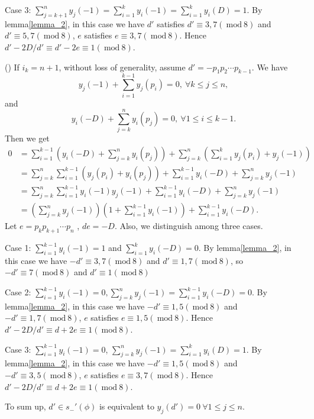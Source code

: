 \documentclass{amsart}
\numberwithin{equation}{section}
\theoremstyle{plain}
\theoremstyle{definition}
\renewcommand{\mod}[1]{\ \mathrm{mod}\ #1}  %
\begin{document}
{	Case 3: $\sum\limits_{j = k+1}^{n} y_{j}(-1) = \sum\limits_{i = 1}^{k}y_{i}(-1) = \sum\limits_{i = 1}^{k} y_{i}(D) = 1$.  By lemma\ref{lemma_2}, in this case we have $d'$ satisfies  $d' \equiv 3,7 (\mod 8)$ and $d' \equiv 5,7 (\mod 8)$, $e$ satisfies  $e \equiv 3,7 (\mod 8)$. Hence $d' - 2D/d' \equiv d' - 2e \equiv 1 (\mod 8)$.

	() If $i_k = n+1$, without loss of generality, assume $d' = -p_{1}p_{2}\cdots p_{k-1}$. We have
	$$ y_{j}(-1) + \sum\limits_{i = 1}^{k-1} y_{j}(p_i) = 0, \ \forall  k \le j \le n,$$
	and
	$$  y_{i}(-D) +\sum\limits_{j = k}^{n} y_{i}(p_j) = 0 , \   \forall 1 \le i \le k-1. $$
Then we get
	$$
	\begin{aligned}
	0 &= \sum\limits_{i = 1}^{k-1} (y_{i}(-D) +\sum\limits_{j = k}^{n} y_{i}(p_j) ) + \sum\limits_{j = k}^{n}(\sum\limits_{i = 1}^{k} y_{j}(p_i) + y_{j}(-1))  \\
	 &= \sum\limits_{j = k}^{n}\sum\limits_{i = 1}^{k-1}(y_{j}(p_i) + y_{i}(p_j)) + \sum\limits_{i = 1}^{k-1} y_{i}(-D) + \sum\limits_{j = k}^{n} y_{j}(-1)\\
	 &= \sum\limits_{j = k}^{n}\sum\limits_{i = 1}^{k-1} y_{i}(-1)y_{j}(-1) + \sum\limits_{i = 1}^{k-1} y_{i}(-D)+ \sum\limits_{j = k}^{n} y_{j}(-1)\\
	&= (\sum\limits_{j = k}^{n} y_{j}(-1))(1+\sum\limits_{i = 1}^{k-1}y_{i}(-1)) + \sum\limits_{i = 1}^{k-1} y_{i}(-D).
	\end{aligned}
	$$
	Let $e = p_{k}p_{k+1}\cdots p_{n}$ , $de = -D$. Also, we distinguish among three cases.

	Case 1: $\sum\limits_{i = 1}^{k-1}y_{i}(-1) = 1$ and  $\sum\limits_{i = 1}^{k} y_{i}(-D) = 0 $. By lemma\ref{lemma_2}, in this case we have $-d' \equiv 3,7 (\mod 8)$ and $d' \equiv 1,7 (\mod 8)$, so $-d' \equiv 7 (\mod 8) $ and $d' \equiv 1 (\mod 8) $

	Case 2: $\sum\limits_{i = 1}^{k-1}y_{i}(-1) = 0, \sum\limits_{j = k}^{n} y_{j}(-1)  = \sum\limits_{i = 1}^{k-1} y_{i}(-D) = 0 $. By lemma\ref{lemma_2}, in this case we have $-d' \equiv 1,5 (\mod 8)$ and $-d' \equiv 1,7 (\mod 8)$, $e$ satisfies  $e \equiv 1,5 (\mod 8)$. Hence $d' - 2D/d' \equiv d + 2e \equiv 1 (\mod 8)$.

	Case 3: $\sum\limits_{i = 1}^{k-1}y_{i}(-1) = 0$, $\sum\limits_{j = k}^{n} y_{j}(-1) =  \sum\limits_{i = 1}^{k} y_{i}(D) = 1$. By lemma\ref{lemma_2}, in this case we have $-d' \equiv 1,5 (\mod 8)$ and $-d' \equiv 3,5 (\mod 8)$, $e$ satisfies  $e \equiv 3,7 (\mod 8)$. Hence $d' - 2D/d' \equiv d + 2e \equiv 1 (\mod 8)$.

	To sum up, $d' \in s_-'(\phi)$ is equivalent to $y_{j}(d') = 0 \ \forall 1\le j \le n$.
}
\end{document}
